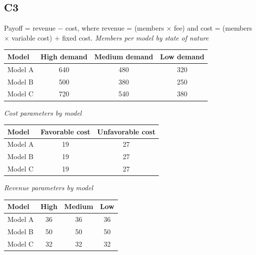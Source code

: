\begin{ExamProblems}
		\subsection*{C3}
		Payoff = revenue $-$ cost, where revenue = (members $\times$ fee) and cost = (members $\times$ variable cost) $+$ fixed cost.
		\textit{Members per model by state of nature}
		\begin{center}
			\begin{tabular}{l c c c}
				\toprule
				Model & High demand & Medium demand & Low demand \\
				\midrule
				Model A & 640 & 480 & 320 \\
				Model B & 500 & 380 & 250 \\
				Model C & 720 & 540 & 380 \\
				\bottomrule
		\end{tabular}
		\end{center}
		\begin{center}
			\begin{minipage}[t]{0.48\linewidth}
				\textit{Cost parameters by model}
				\begin{center}
					\begin{tabular}{l c c}
						\toprule
						Model & Favorable cost & Unfavorable cost \\
						\midrule
						Model A & 19 & 27 \\
						Model B & 19 & 27 \\
						Model C & 19 & 27 \\
						\bottomrule
					\end{tabular}
				\end{center}
			\end{minipage}
			\hfill
			\begin{minipage}[t]{0.48\linewidth}
				\textit{Revenue parameters by model}
				\begin{center}
					\begin{tabular}{l c c c}
						\toprule
						Model & High & Medium & Low \\
						\midrule
						Model A & 36 & 36 & 36 \\
						Model B & 50 & 50 & 50 \\
						Model C & 32 & 32 & 32 \\
						\bottomrule
					\end{tabular}
				\end{center}
			\end{minipage}
		\end{center}
		\begin{center}

\end{center}
\end{ExamProblems}
